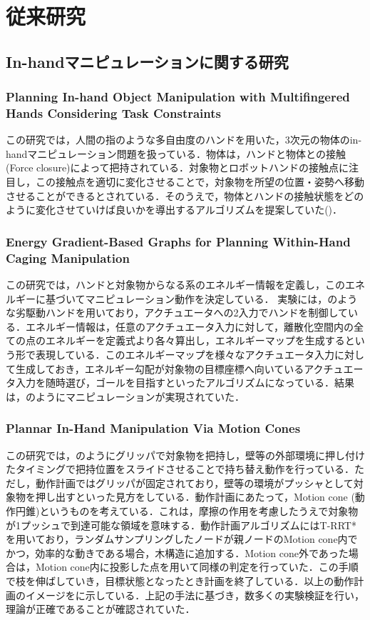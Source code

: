 \documentclass[a4paper,twoside,12pt,papersize, dvipdfmx]{iirthesis}
\begin{document}
\section{従来研究}\label{sec::intro::relatedresearch}
\subsection{In-handマニピュレーションに関する研究}
\subsubsection{Planning In-hand Object Manipulation with Multifingered Hands Considering Task Constraints \cite{hertkorn2013}}
この研究では，人間の指のような多自由度のハンドを用いた，3次元の物体のin-handマニピュレーション問題を扱っている．物体は，ハンドと物体との接触(Force closure)によって把持されている．対象物とロボットハンドの接触点に注目し，この接触点を適切に変化させることで，対象物を所望の位置・姿勢へ移動させることができるとされている．そのうえで，物体とハンドの接触状態をどのように変化させていけば良いかを導出するアルゴリズムを提案していた(\figref{})．

\subsubsection{Energy Gradient-Based Graphs for Planning Within-Hand Caging Manipulation \cite{bircher2019}}
この研究では，ハンドと対象物からなる系のエネルギー情報を定義し，このエネルギーに基づいてマニピュレーション動作を決定している．
実験には，のような劣駆動ハンドを用いており，アクチュエータへの2入力でハンドを制御している．エネルギー情報は，任意のアクチュエータ入力に対して，離散化空間内の全ての点のエネルギーを定義式より各々算出し，エネルギーマップを生成するという形で表現している．このエネルギーマップを様々なアクチュエータ入力に対して生成しておき，エネルギー勾配が対象物の目標座標へ向いているアクチュエータ入力を随時選び，ゴールを目指すといったアルゴリズムになっている．結果は，のようにマニピュレーションが実現されていた．

\subsubsection{Plannar In-Hand Manipulation Via Motion Cones \cite{chavan-dafle2020}}
この研究では，のようにグリッパで対象物を把持し，壁等の外部環境に押し付けたタイミングで把持位置をスライドさせることで持ち替え動作を行っている．ただし，動作計画ではグリッパが固定されており，壁等の環境がプッシャとして対象物を押し出すといった見方をしている．動作計画にあたって，Motion cone (動作円錐)というものを考えている．これは，摩擦の作用を考慮したうえで対象物が1プッシュで到達可能な領域を意味する．動作計画アルゴリズムにはT-RRT*を用いており，ランダムサンプリングしたノードが親ノードのMotion cone内でかつ，効率的な動きである場合，木構造に追加する．Motion cone外であった場合は，Motion cone内に投影した点を用いて同様の判定を行っていた．この手順で枝を伸ばしていき，目標状態となったとき計画を終了している．以上の動作計画のイメージをに示している．上記の手法に基づき，数多くの実験検証を行い，理論が正確であることが確認されていた．
\end{document}

